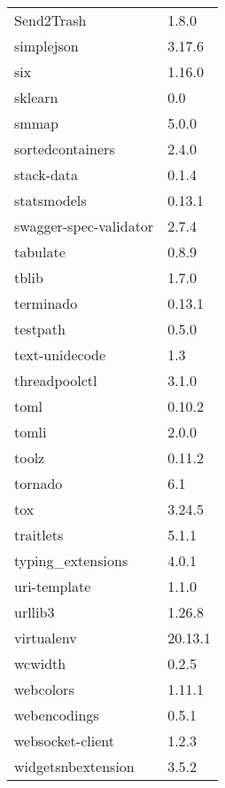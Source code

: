 \begin{table}[h]
\begin{tabular}{|l|l|}
    Send2Trash                   & 1.8.0     \\
    simplejson                   & 3.17.6    \\
    six                          & 1.16.0    \\
    sklearn                      & 0.0       \\
    smmap                        & 5.0.0     \\
    sortedcontainers             & 2.4.0     \\
    stack-data                   & 0.1.4     \\
    statsmodels                  & 0.13.1    \\
    swagger-spec-validator       & 2.7.4     \\
    tabulate                     & 0.8.9     \\
    tblib                        & 1.7.0     \\
    terminado                    & 0.13.1    \\
    testpath                     & 0.5.0     \\
    text-unidecode               & 1.3       \\
    threadpoolctl                & 3.1.0     \\
    toml                         & 0.10.2    \\
    tomli                        & 2.0.0     \\
    toolz                        & 0.11.2    \\
    tornado                      & 6.1       \\
    tox                          & 3.24.5    \\
    traitlets                    & 5.1.1     \\
    typing\_extensions           & 4.0.1     \\
    uri-template                 & 1.1.0     \\
    urllib3                      & 1.26.8    \\
    virtualenv                   & 20.13.1   \\
    wcwidth                      & 0.2.5     \\
    webcolors                    & 1.11.1    \\
    webencodings                 & 0.5.1     \\
    websocket-client             & 1.2.3     \\
    widgetsnbextension           & 3.5.2     \\

\end{tabular}
\end{table}
